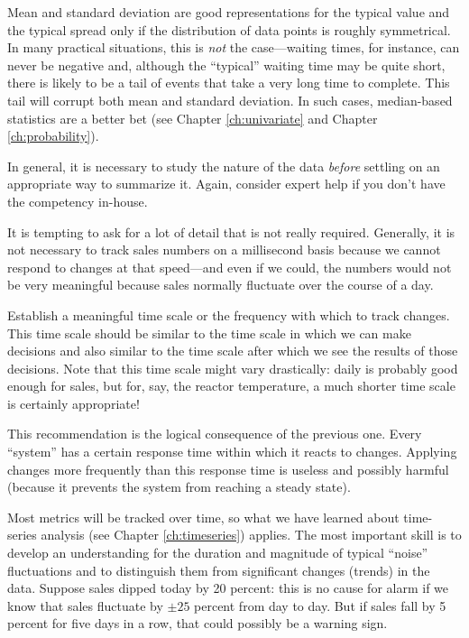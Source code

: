 Mean and standard deviation are good representations for the typical
value and the typical spread only if the distribution of data points
is roughly symmetrical. In many practical situations, this is
\emph{not} the case---waiting times, for instance, can never be
negative and, although the ``typical'' waiting time may be quite
short, there is likely to be a tail of events that take a very long
time to complete. This tail will corrupt both mean and standard
deviation. In such cases, median-based statistics are a better bet (see
Chapter \ref{ch:univariate} and Chapter \ref{ch:probability}).

In general, it is necessary to study the nature of the data
\emph{before} settling on an appropriate way to summarize it. Again,
consider expert help if you don't have the competency in-house.

It is tempting to ask for a lot of detail that is not really required.
Generally, it is not necessary to track sales numbers on a millisecond
basis because we cannot respond to changes at that speed---and even
if we could, the numbers would not be very meaningful because sales
normally fluctuate over the course of a day.

Establish a meaningful time scale or the frequency with which to track
changes. This time scale should be similar to the time scale in which
we can make decisions and also similar to the time scale after which
we see the results of those decisions. Note that this time scale might
vary drastically: daily is probably good enough for sales, but for,
say, the reactor temperature, a much shorter time scale is certainly
appropriate!

This recommendation is the logical consequence of the previous one.
Every ``system'' has a certain response time within which it reacts to
changes. Applying changes more frequently than this response time is
useless and possibly harmful (because it prevents the system from
reaching a steady state).

 Most metrics will be tracked over time, so what we have learned
about time-series analysis (see Chapter \ref{ch:timeseries}) applies.
The most important skill is to develop an understanding for the duration
and magnitude of typical ``noise'' fluctuations and to distinguish
them from significant changes (trends) in the data.  Suppose sales
dipped today by 20 percent: this is no cause for alarm if we know that
sales fluctuate by $\pm 25$ percent from day to day. But if sales fall
by 5 percent for five days in a row, that could possibly be a warning
sign.

